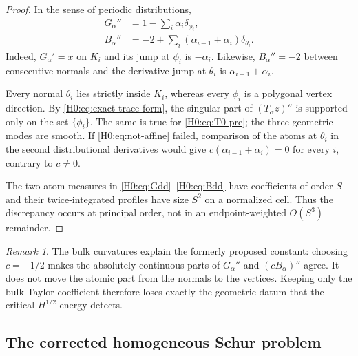 \documentclass[11pt]{amsart}
\numberwithin{equation}{section}
\theoremstyle{definition}
\theoremstyle{remark}
\newtheorem{remark}[theorem]{Remark}
\begin{document}
\begin{proof}
In the sense of periodic distributions,
\begin{align}
 G_\alpha''
 &=1-\sum_i\alpha_i\delta_{\phi_i},\label{H0:eq:Gdd}\\
 B_\alpha''
 &=-2+\sum_i(\alpha_{i-1}+\alpha_i)\delta_{\theta_i}.
 \label{H0:eq:Bdd}
\end{align}
Indeed, $G_\alpha'=x$ on $K_i$ and its jump at $\phi_i$ is
$-\alpha_i$.  Likewise, $B_\alpha''=-2$ between consecutive normals and
the derivative jump at $\theta_i$ is $\alpha_{i-1}+\alpha_i$.

Every normal $\theta_i$ lies strictly inside $K_i$, whereas every
$\phi_i$ is a polygonal vertex direction.  By
\eqref{H0:eq:exact-trace-form}, the singular part of
$(T_\alpha z)''$ is supported only on the set $\{\phi_i\}$.  The same is
true for \eqref{H0:eq:T0-pre}; the three geometric modes are smooth.  If
\eqref{H0:eq:not-affine} failed, comparison of the atoms at $\theta_i$ in the
second distributional derivatives would give
$c(\alpha_{i-1}+\alpha_i)=0$ for every $i$, contrary to $c\ne0$.

The two atom measures in \eqref{H0:eq:Gdd}--\eqref{H0:eq:Bdd} have coefficients
of order $S$ and their twice-integrated profiles have size $S^2$ on a
normalized cell.  Thus the discrepancy occurs at principal order, not in
an endpoint-weighted $O(S^3)$ remainder.
\end{proof}

\begin{remark}
The bulk curvatures explain the formerly proposed constant: choosing
$c=-1/2$ makes the absolutely continuous parts of
$G_\alpha''$ and $(cB_\alpha)''$ agree.  It does not move the atomic part
from the normals to the vertices.  Keeping only the bulk Taylor coefficient
therefore loses exactly the geometric datum that the critical
$H^{1/2}$ energy detects.
\end{remark}

\subsection{The corrected homogeneous Schur problem}
\end{document}
